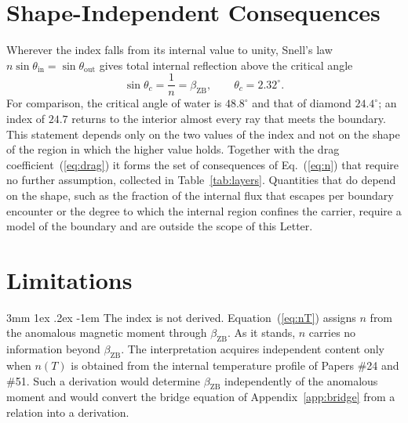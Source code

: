 \documentclass[%
 reprint, amsmath,amssymb, aps, prb, ]{revtex4-2}
\makeatletter
\numberwithin{equation}{section}
\renewcommand\paragraph{%
  \@startsection{paragraph}{4}{\z@}%
    {3mm \@plus 1ex \@minus .2ex}%
    {-1em}%
    {\normalfont\normalsize\itshape}}
\makeatother
\begin{document}
\section{Shape-Independent Consequences}
\label{sec:snell}

Wherever the index falls from its internal value to unity, Snell's law $n\sin\theta_{\text{in}} = \sin\theta_{\text{out}}$ gives total internal reflection above the critical angle
\begin{equation}
\sin\theta_c = \frac{1}{n} = \beta_{\text{ZB}}, \qquad \theta_c = 2.32^\circ .
\label{eq:thetac}
\end{equation}
For comparison, the critical angle of water is $48.8^\circ$ and that of diamond $24.4^\circ$; an index of $24.7$ returns to the interior almost every ray that meets the boundary. This statement depends only on the two values of the index and not on the shape of the region in which the higher value holds. Together with the drag coefficient~(\ref{eq:drag}) it forms the set of consequences of Eq.~(\ref{eq:n}) that require no further assumption, collected in Table~\ref{tab:layers}. Quantities that do depend on the shape, such as the fraction of the internal flux that escapes per boundary encounter or the degree to which the internal region confines the carrier, require a model of the boundary and are outside the scope of this Letter.

\section{Limitations}
\label{sec:limits}

\paragraph{The index is not derived.} Equation~(\ref{eq:nT}) assigns $n$ from the anomalous magnetic moment through $\beta_{\text{ZB}}$. As it stands, $n$ carries no information beyond $\beta_{\text{ZB}}$. The interpretation acquires independent content only when $n(T)$ is obtained from the internal temperature profile of Papers \#24 and \#51. Such a derivation would determine $\beta_{\text{ZB}}$ independently of the anomalous moment and would convert the bridge equation of Appendix~\ref{app:bridge} from a relation into a derivation.
\end{document}
